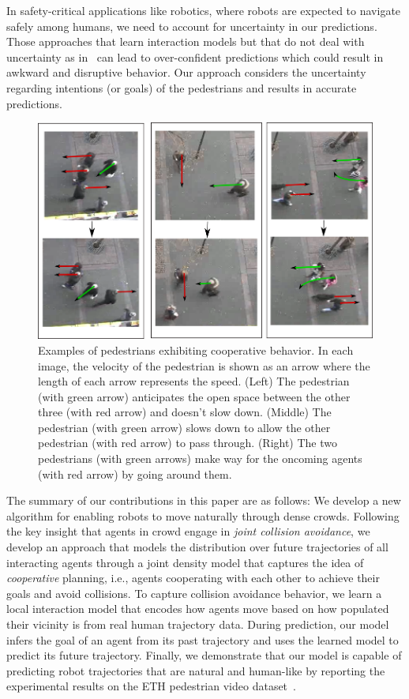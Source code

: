 %
In safety-critical applications like robotics, where robots are
expected to navigate safely among humans, we need to account for
uncertainty in our predictions. Those approaches that learn
interaction models but that do not deal with uncertainty as
in~\cite{alahi16} can lead to over-confident predictions which could
result in awkward and disruptive behavior. Our approach considers the
uncertainty regarding intentions (or goals) of the pedestrians and
results in accurate predictions.

\begin{figure}[t!]
  \centering
  \includegraphics[width=\linewidth]{Figures/drawing-horizontal.png}
  \caption{Examples of pedestrians exhibiting cooperative behavior. In
    each image, the velocity of the pedestrian is shown as an arrow
    where the length of each arrow represents the speed. (Left) The
    pedestrian (with green arrow) anticipates the open space between
    the other three (with red arrow) and doesn't slow down. (Middle)
    The pedestrian (with green arrow) slows down to allow the other
    pedestrian (with red arrow) to pass through. (Right) The two
    pedestrians (with green arrows) make way for the oncoming agents
    (with red arrow) by going around them.}
  \label{fig:intro}
  \vspace{-15pt}
\end{figure}

%
%
%
The summary of our contributions in this paper are as follows: We
develop a new algorithm for enabling robots to move naturally through
dense crowds.
%
%
%
Following the key insight that agents in crowd engage in \textit{joint
  collision avoidance}, we develop an approach that models the
distribution over future trajectories of all interacting agents
through a joint density model that captures the idea of
\textit{cooperative} planning, i.e., agents cooperating with each
other to achieve their goals and avoid collisions.  To capture
collision avoidance behavior, we learn a local interaction model that
encodes how agents move based on how populated their vicinity is from
real human trajectory data.  During prediction, our model infers the
goal of an agent from its past trajectory and uses the learned model
to predict its future trajectory.  Finally, we demonstrate that our
model is capable of predicting robot trajectories that are natural and
human-like by reporting the experimental results on the ETH pedestrian
video dataset~\cite{pellegrini09}.

